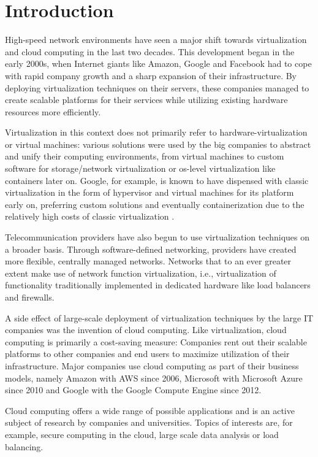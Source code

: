 \chapter{Introduction}
\label{chap:introduction}

High-speed network environments have seen a major shift towards virtualization
and cloud computing in the last two decades. This development began in the early
2000s, when Internet giants like Amazon, Google and Facebook had to cope with
rapid company growth and a sharp expansion of their infrastructure. By deploying
virtualization techniques on their servers, these companies managed to create
scalable platforms for their services while utilizing existing hardware
resources more efficiently.

Virtualization in this context does not primarily refer to
hardware-virtualization or virtual machines: various solutions were used by the
big companies to abstract and unify their computing environments, from virtual
machines to custom software for storage/network virtualization or \ac{os}-level
virtualization like containers later on. Google, for example, is known to have
dispensed with classic virtualization in the form of hypervisor and virtual
machines for its platform early on, preferring custom solutions and eventually
containerization due to the relatively high costs of classic virtualization
\cite{verma2015large}.

Telecommunication providers have also begun to use virtualization techniques on
a broader basis. Through software-defined networking, providers have created
more flexible, centrally managed networks. Networks that to an ever greater
extent make use of network function virtualization, i.e., virtualization of
functionality traditionally implemented in dedicated hardware like load
balancers and firewalls.

A side effect of large-scale deployment of virtualization techniques by the
large IT companies was the invention of cloud computing. Like virtualization,
cloud computing is primarily a cost-saving measure: Companies rent out their
scalable platforms to other companies and end users to maximize utilization of
their infrastructure. Major companies use cloud computing as part of their
business models, namely Amazon with AWS since 2006, Microsoft with Microsoft
Azure since 2010 and Google with the Google Compute Engine since 2012.

Cloud computing offers a wide range of possible applications and is an active
subject of research by companies and universities. Topics of interests are, for
example, secure computing in the cloud, large scale data analysis or load
balancing.


